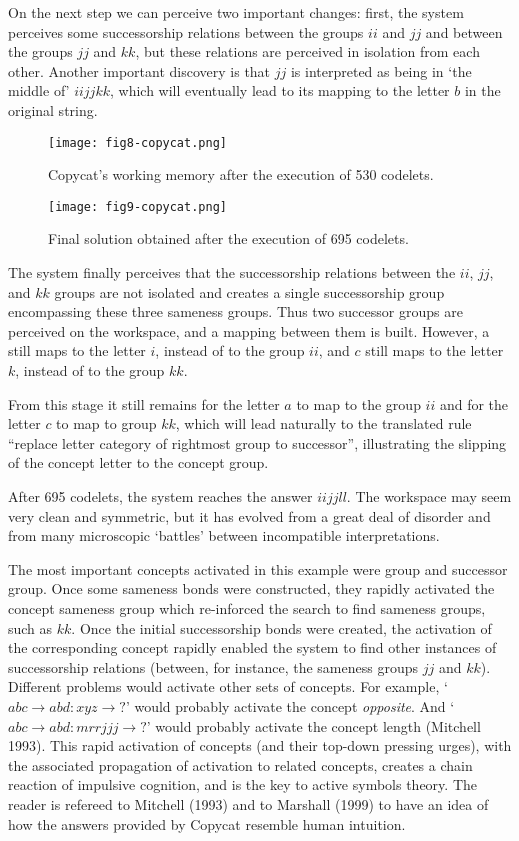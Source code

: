 On the next step we can perceive two important changes:  first, the system perceives some successorship relations between the groups $ii$ and $jj$ and between the groups $jj$ and $kk$, but these relations are perceived in isolation from each other.    Another important discovery is that $jj$ is interpreted as being in `the middle of' $iijjkk$, which will eventually lead to its mapping to the letter $b$ in the original string.


\begin{figure}
\centering
\texttt{[image: fig8-copycat.png]}
\caption{\label{fig:f8}Copycat’s working memory after the execution of 530 codelets.}
\end{figure}


\begin{figure}
\centering
\texttt{[image: fig9-copycat.png]}
\caption{\label{fig:f9}Final solution obtained after the execution of 695 codelets.}
\end{figure}


The system finally perceives that the successorship relations between the $ii$, $jj$, and $kk$ groups are not isolated and creates a single successorship group encompassing these three sameness groups.  Thus two successor groups are perceived on the workspace, and a mapping between them is built. However, a still maps to the letter $i$, instead of to the group $ii$, and $c$ still maps to the letter $k$, instead of to the group $kk$.

From this stage it still remains for the letter $a$ to map to the group $ii$ and for the letter $c$ to map to group $kk$, which will lead naturally to the translated rule ``replace letter category of rightmost group to successor'', illustrating the slipping of the concept letter to the concept group.

After 695 codelets, the system reaches the answer $iijjll$.  The workspace may seem very clean and symmetric, but it has evolved from a great deal of disorder and from many microscopic `battles' between incompatible interpretations.  

The most important concepts activated in this example were group and successor group.  Once some sameness bonds were constructed, they rapidly activated the concept sameness group which re-inforced the search to find sameness groups, such as $kk$.  Once the initial successorship bonds were created, the activation of the corresponding concept rapidly enabled the system to find other instances of successorship relations (between, for instance, the sameness groups $jj$ and $kk$).  Different problems would activate other sets of concepts.  For example, `$abc\to abd: xyz\to ?$’ would probably activate the concept \emph{opposite}. And `$abc\to abd: mrrjjj\to ?$' would probably activate the concept length (Mitchell 1993). This rapid activation of concepts (and their top-down pressing urges), with the associated propagation of activation to related concepts, creates a chain reaction of impulsive cognition, and is the key to active symbols theory.  The reader is refereed to Mitchell (1993) and to Marshall (1999) to have an idea of how the answers provided by Copycat resemble human intuition.  

